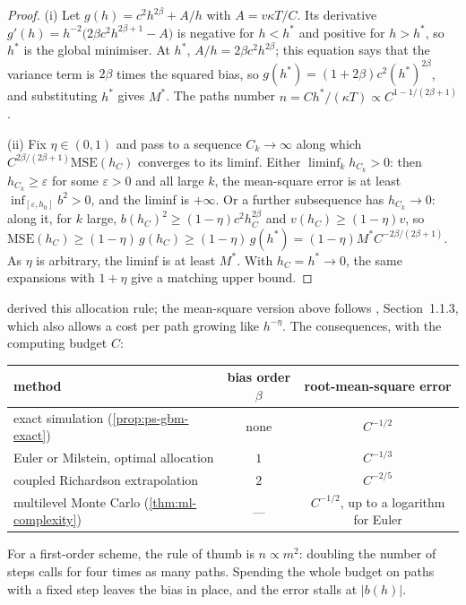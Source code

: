 \begin{proof}
(i) Let $g(h)=c^2h^{2\beta}+A/h$ with $A=v\kappa T/C$. Its derivative
$g'(h)=h^{-2}\big(2\beta c^2h^{2\beta+1}-A\big)$ is negative for $h<h^*$ and positive for
$h>h^*$, so $h^*$ is the global minimiser. At $h^*$, $A/h=2\beta c^2h^{2\beta}$; this equation says that the variance term is $2\beta$ times the squared bias, so
$g(h^*)=(1+2\beta)c^2(h^*)^{2\beta}$, and substituting $h^*$ gives $M^*$. The paths number
$n=Ch^*/(\kappa T)\propto C^{1-1/(2\beta+1)}$.

(ii) Fix $\eta\in(0,1)$ and pass to a sequence $C_k\to\infty$ along which
$C^{2\beta/(2\beta+1)}\mathrm{MSE}(h_C)$ converges to its liminf. Either
$\liminf_kh_{C_k}>0$: then $h_{C_k}\ge\varepsilon$ for some $\varepsilon>0$ and all large $k$,
the mean-square error is at least $\inf_{[\varepsilon,h_0]}b^2>0$, and the liminf is
$+\infty$. Or a further subsequence has $h_{C_k}\to0$: along it, for $k$ large,
$b(h_C)^2\ge(1-\eta)c^2h_C^{2\beta}$ and $v(h_C)\ge(1-\eta)v$, so
$\mathrm{MSE}(h_C)\ge(1-\eta)\,g(h_C)\ge(1-\eta)\,g(h^*)=(1-\eta)M^*C^{-2\beta/(2\beta+1)}$.
As $\eta$ is arbitrary, the liminf is at least $M^*$. With $h_C=h^*\to0$, the same
expansions with $1+\eta$ give a matching upper bound.
\end{proof}

 derived this allocation rule; the mean-square version above follows
\textcite{glasserman-mc}, Section~1.1.3, which also allows a cost per path growing like
$h^{-\eta}$. The consequences, with the computing budget $C$:
\begin{center}
\begin{tabular}{lcc}
\toprule
method & bias order $\beta$ & root-mean-square error\\
\midrule
exact simulation (\cref{prop:ps-gbm-exact}) & none & $C^{-1/2}$\\
Euler or Milstein, optimal allocation & $1$ & $C^{-1/3}$\\
coupled Richardson extrapolation & $2$ & $C^{-2/5}$\\
multilevel Monte Carlo (\cref{thm:ml-complexity}) & --- & $C^{-1/2}$, up to a logarithm for Euler\\
\bottomrule
\end{tabular}
\end{center}
For a first-order scheme, the rule of thumb is $n\propto m^2$: doubling the number of steps
calls for four times as many paths. Spending the whole budget on paths with a fixed step
leaves the bias in place, and the error stalls at $|b(h)|$.

